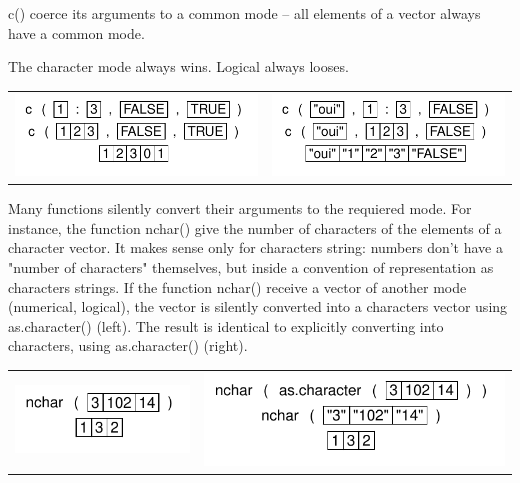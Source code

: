 \documentclass[pdflatex]{article}
\begin{document}
c() coerce its arguments to a common mode -- all elements of a vector always
have a common mode.

The character mode always wins. Logical always looses.

\begin{tabular}{cc}
\includegraphics{conversion_1} & \includegraphics{conversion}\\
\end{tabular}

Many functions silently convert their arguments to the requiered mode. For
instance, the function nchar() give the number of characters of the elements of
a character vector. It makes sense only for characters string: numbers don't
have a "number of characters" themselves, but inside a convention of
representation as characters strings. If the function nchar() receive a vector
of another mode (numerical, logical), the vector is silently converted into a
characters vector using as.character() (left). The result is identical to
explicitly converting into characters, using as.character() (right).

\begin{tabular}{cc}
\includegraphics{conversion_nchar} & \includegraphics{conversion_as_character}\\
\end{tabular}
\end{document}
